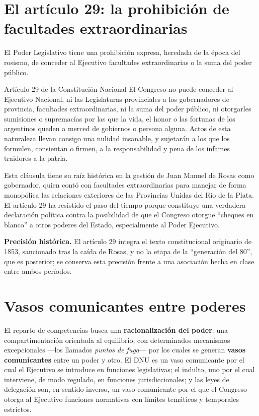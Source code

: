 \documentclass[12pt,oneside]{book}
\begin{document}
\section{El artículo 29: la prohibición de facultades extraordinarias}

El Poder Legislativo tiene una prohibición expresa, heredada de la época del rosismo, de conceder al Ejecutivo facultades extraordinarias o la suma del poder público.

\begin{norma}{Artículo 29 de la Constitución Nacional}
El Congreso no puede conceder al Ejecutivo Nacional, ni las Legislaturas provinciales a los gobernadores de provincia, facultades extraordinarias, ni la suma del poder público, ni otorgarles sumisiones o supremacías por las que la vida, el honor o las fortunas de los argentinos queden a merced de gobiernos o persona alguna. Actos de esta naturaleza llevan consigo una nulidad insanable, y sujetarán a los que los formulen, consientan o firmen, a la responsabilidad y pena de los infames traidores a la patria.
\end{norma}

Esta cláusula tiene su raíz histórica en la gestión de Juan Manuel de Rosas como gobernador, quien contó con facultades extraordinarias para manejar de forma monopólica las relaciones exteriores de las Provincias Unidas del Río de la Plata. El artículo 29 ha resistido el paso del tiempo porque constituye una verdadera declaración política contra la posibilidad de que el Congreso otorgue ``cheques en blanco'' a otros poderes del Estado, especialmente al Poder Ejecutivo.

\begin{note}
\textbf{Precisión histórica.} El artículo 29 integra el texto constitucional originario de 1853, sancionado tras la caída de Rosas, y no la etapa de la ``generación del 80'', que es posterior; se conserva esta precisión frente a una asociación hecha en clase entre ambos períodos.
\end{note}

\section{Vasos comunicantes entre poderes}

El reparto de competencias busca una \textbf{racionalización del poder}: una compartimentación orientada al equilibrio, con determinados mecanismos excepcionales ---los llamados \emph{puntos de fuga}--- por los cuales se generan \textbf{vasos comunicantes} entre un poder y otro. El DNU es un vaso comunicante por el cual el Ejecutivo se introduce en funciones legislativas; el indulto, uno por el cual interviene, de modo regulado, en funciones jurisdiccionales; y las leyes de delegación son, en sentido inverso, un vaso comunicante por el que el Congreso otorga al Ejecutivo funciones normativas con límites temáticos y temporales estrictos.
\end{document}
